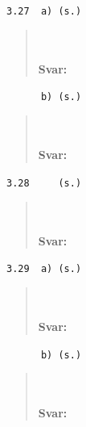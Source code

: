 \documentclass[a4paper]{article}
\newcommand{\tskcol}[1]{\textcolor{tskcol}{#1}}
\begin{document}
\texttt{\tskcol{3.27~~a) (s.)}}
\begin{quotation}
	\noindent
	\\ \\
	\textbf{Svar:}
\end{quotation}

\texttt{\tskcol{~~~~~~b) (s.)}}
\begin{quotation}
	\noindent
	\\ \\
	\textbf{Svar:}
\end{quotation}

\texttt{\tskcol{3.28~~~~ (s.)}}
\begin{quotation}
	\noindent
	\\ \\
	\textbf{Svar:}
\end{quotation}

\texttt{\tskcol{3.29~~a) (s.)}}
\begin{quotation}
	\noindent
	\\ \\
	\textbf{Svar:}
\end{quotation}

\texttt{\tskcol{~~~~~~b) (s.)}}
\begin{quotation}
	\noindent
	\\ \\
	\textbf{Svar:}
\end{quotation}
\end{document}
